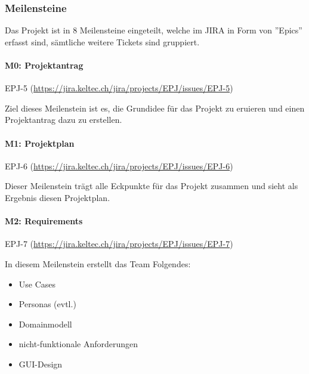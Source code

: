 \documentclass[a4paper]{article}
\def\jiraurl{https://jira.keltec.ch/jira}
\newcommand{\fulljiraissue}[1]{EPJ-#1 (\url{\jiraurl/projects/EPJ/issues/EPJ-#1})}
\begin{document}
\subsubsection{Meilensteine}

Das Projekt ist in 8 Meilensteine eingeteilt, welche im JIRA in Form von ''Epics'' erfasst sind, sämtliche weitere Tickets sind gruppiert.

\paragraph{M0: Projektantrag} \fulljiraissue{5}

Ziel dieses Meilenstein ist es, die Grundidee für das Projekt zu eruieren und einen Projektantrag dazu zu erstellen.

\paragraph{M1: Projektplan} \fulljiraissue{6}

Dieser Meilenstein trägt alle Eckpunkte für das Projekt zusammen und sieht als Ergebnis diesen Projektplan.

\paragraph{M2: Requirements} \fulljiraissue{7}


In diesem Meilenstein erstellt das Team Folgendes:

\begin{itemize}
  \item Use Cases
  \item Personas (evtl.)
  \item Domainmodell
  \item nicht-funktionale Anforderungen
  \item GUI-Design
\end{itemize}
\end{document}
